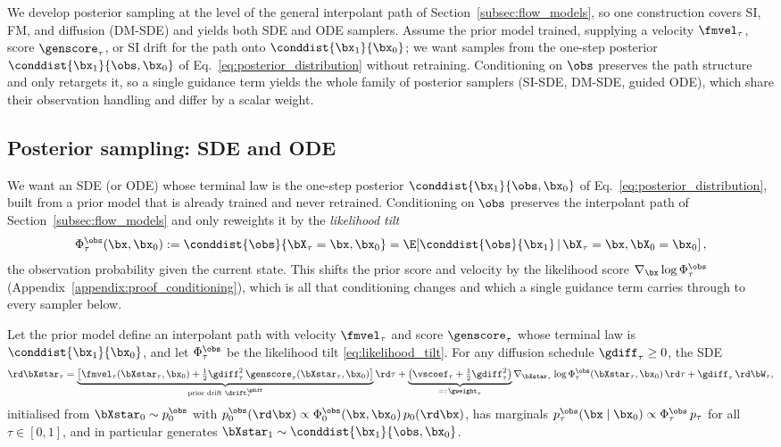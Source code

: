
We develop posterior sampling at the level of the general interpolant path of Section~\ref{subsec:flow_models}, so one construction covers SI, FM, and diffusion (DM-SDE) and yields both SDE and ODE samplers. Assume the prior model trained, supplying a velocity $\fmvel_\tau$, score $\genscore_\tau$, or SI drift for the path onto $\conddist{\bx_1}{\bx_0}$; we want samples from the one-step posterior $\conddist{\bx_1}{\obs,\bx_0}$ of Eq.~\eqref{eq:posterior_distribution} without retraining. Conditioning on $\obs$ preserves the path structure and only retargets it, so a single guidance term yields the whole family of posterior samplers (SI-SDE, DM-SDE, guided ODE), which share their observation handling and differ by a scalar weight.
\subsection{Posterior sampling: SDE and ODE}
\label{subsec:posterior_dynamics}

We want an SDE (or ODE) whose terminal law is the one-step posterior $\conddist{\bx_1}{\obs,\bx_0}$ of Eq.~\eqref{eq:posterior_distribution}, built from a prior model that is already trained and never retrained. Conditioning on $\obs$ preserves the interpolant path of Section~\ref{subsec:flow_models} and only reweights it by the \emph{likelihood tilt}
\begin{align}\label{eq:likelihood_tilt}
    \Phi_\tau^{\obs}(\bx,\bx_0) := \conddist{\obs}{\bX_\tau=\bx,\bx_0}
    = \E\!\left[\conddist{\obs}{\bx_1}\,\middle|\,\bX_\tau=\bx,\bX_0=\bx_0\right],
\end{align}
the observation probability given the current state. This shifts the prior score and velocity by the likelihood score $\nabla_{\bx}\log\Phi_\tau^{\obs}$ (Appendix~\ref{appendix:proof_conditioning}), which is all that conditioning changes and which a single guidance term carries through to every sampler below.

\begin{theorem}\label{theorem:unified_posterior}
Let the prior model define an interpolant path with velocity $\fmvel_\tau$ and score $\genscore_\tau$ whose terminal law is $\conddist{\bx_1}{\bx_0}$, and let $\Phi_\tau^{\obs}$ be the likelihood tilt \eqref{eq:likelihood_tilt}. For any diffusion schedule $\gdiff_\tau\ge0$, the SDE
\begin{align}\label{eq:unified_posterior_drift}
    \rd\bXstar_\tau
    = \underbrace{\left[\fmvel_\tau(\bXstar_\tau,\bx_0) + \tfrac12\gdiff_\tau^2\,\genscore_\tau(\bXstar_\tau,\bx_0)\right]}_{\text{prior drift }\drift^{\gdiff}_\tau}\rd\tau
    + \underbrace{\big(\vscoef_\tau + \tfrac12\gdiff_\tau^2\big)}_{=:\,\gweight_\tau}\nabla_{\bXstar_\tau}\log\Phi_\tau^{\obs}(\bXstar_\tau,\bx_0)\,\rd\tau
    + \gdiff_\tau\,\rd\bW_\tau ,
\end{align}
initialised from $\bXstar_0\sim p_0^{\obs}$ with $p_0^{\obs}(\rd\bx)\propto\Phi_0^{\obs}(\bx,\bx_0)\,p_0(\rd\bx)$, has marginals $p_\tau^{\obs}(\bx\mid\bx_0)\propto\Phi_\tau^{\obs}\,p_\tau$ for all $\tau\in[0,1]$, and in particular generates $\bXstar_1\sim\conddist{\bx_1}{\obs,\bx_0}$.
\end{theorem}

